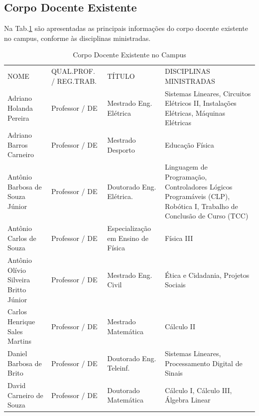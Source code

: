 \documentclass{paper}
\begin{document}
\subsection{Corpo Docente Existente}

Na Tab.\ref{tab2} são apresentadas as principais informações do corpo docente existente no campus, conforme às disciplinas ministradas.

\if{}
    \begin{longtable}{|p{3.0cm}|p{2.5cm}|p{2.0cm}|p{6.3cm}|}
    \caption{Corpo Docente Existente no Campus}\label{tab2} 
    \vspace{-0.25cm}
    \\ \hline 
    \cellcolor{\cinza}NOME & \cellcolor{\cinza}QUAL.PROF. / REG.TRAB. & \cellcolor{\cinza}TÍTULO & \cellcolor{\cinza}DISCIPLINAS MINISTRADAS \\ 
    \hline
    Adriano Holanda Pereira & Professor / DE  &  Mestrado Eng. Elétrica  & Sistemas Lineares, Circuitos Elétricos II, Instalações Elétricas, Máquinas Elétricas \\ \hline    
    Adriano Barros Carneiro &  Professor / DE  &  Mestrado Desporto  &  Educação Física \\ \hline
    Antônio Barbosa de Souza Júnior & Professor / DE  &  Doutorado Eng. Elétrica. &  Linguagem de Programação, Controladores Lógicos Programáveis (CLP), Robótica I, Trabalho de Conclusão de Curso (TCC) \\ \hline
    Antônio Carlos de Souza & Professor / DE  &  Especialização em Ensino de Física &  Física III \\ \hline
    Antônio Olívio Silveira Britto Júnior & Professor / DE  &  Mestrado Eng. Civil  & Ética e Cidadania, Projetos Sociais  \\ \hline
    Carlos Henrique Sales Martins  &  Professor / DE  &  Mestrado Matemática &  Cálculo II \\ \hline
    Daniel Barbosa de Brito  &  Professor / DE  &  Doutorado Eng. Teleinf. &  Sistemas Lineares, Processamento Digital de Sinais \\ \hline
    David Carneiro de Souza   &  Professor / DE  &  Doutorado Matemática &  Cálculo I, Cálculo III, Álgebra Linear \\ \hline

\end{longtable}
\end{document}

